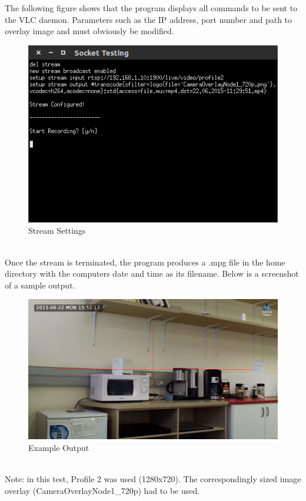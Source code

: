 \documentclass[a4paper,11pt]{report}
\begin{document}
The following figure shows that the program displays all commands to be sent to the VLC daemon. Parameters such as the IP address, port number and path to overlay image and must obviously be modified. 
 \begin{figure}[h]
   \begin{center}
     \includegraphics[scale=0.5]{Console_3}
     \caption{Stream Settings}
   \end{center}
 \end{figure} \\ 
Once the stream is terminated, the program produces a .mpg file in the home directory with the computers date and time as its filename. Below is a screenshot of a sample output.
 \begin{figure}[h]
   \begin{center}
     \includegraphics[scale=0.3]{demo}
     \caption{Example Output}
   \end{center}
 \end{figure} \\
Note: in this test, Profile 2 was used (1280x720). The correspondingly sized image overlay (CameraOverlayNode1\_720p) had to be used.
\end{document}
